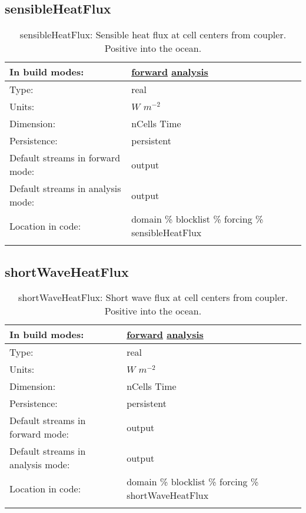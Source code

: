 \subsection[sensibleHeatFlux]{sensibleHeatFlux}
\label{subsec:var_sec_forcing_sensibleHeatFlux}
\begin{center}
\begin{longtable}{| p{2.0in} | p{4.0in} |}
        \hline 
        In build modes: & \hyperref[subsec:forward_var_tab_forcing]{forward} \hyperref[subsec:analysis_var_tab_forcing]{analysis} \\
        \hline 
        Type: & real \\
        \hline 
        Units: & $W$ $m^{-2}$ \\
        \hline 
        Dimension: & nCells Time \\
        \hline 
        Persistence: & persistent \\
        \hline 
		 Default streams in forward mode: &  output \\
        \hline 
		 Default streams in analysis mode: &  output \\
        \hline 
		 Location in code: & domain \% blocklist \% forcing \% sensibleHeatFlux \\
		 \hline 
    \caption{sensibleHeatFlux: Sensible heat flux at cell centers from coupler. Positive into the ocean.}
\end{longtable}
\end{center}
\subsection[shortWaveHeatFlux]{shortWaveHeatFlux}
\label{subsec:var_sec_forcing_shortWaveHeatFlux}
\begin{center}
\begin{longtable}{| p{2.0in} | p{4.0in} |}
        \hline 
        In build modes: & \hyperref[subsec:forward_var_tab_forcing]{forward} \hyperref[subsec:analysis_var_tab_forcing]{analysis} \\
        \hline 
        Type: & real \\
        \hline 
        Units: & $W$ $m^{-2}$ \\
        \hline 
        Dimension: & nCells Time \\
        \hline 
        Persistence: & persistent \\
        \hline 
		 Default streams in forward mode: &  output \\
        \hline 
		 Default streams in analysis mode: &  output \\
        \hline 
		 Location in code: & domain \% blocklist \% forcing \% shortWaveHeatFlux \\
		 \hline 
    \caption{shortWaveHeatFlux: Short wave flux at cell centers from coupler. Positive into the ocean.}
\end{longtable}
\end{center}
